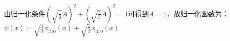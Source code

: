 
\begin{issues}
\issueDraft
\issueTODO
\end{issues}

\subsection{ }
由归一化条件$\displaystyle (\sqrt{\frac{1}{3}}A)^{2} + (\sqrt{\frac{2}{3}}A)^{2} = 1 $可得到$A=1$．故归一化函数为：\\

$\displaystyle \psi(x) = \sqrt{\frac{1}{3}}\phi_{210}(x)+\sqrt{\frac{2}{3}} \phi_{310}(x)$ \\

\subsection{ }
